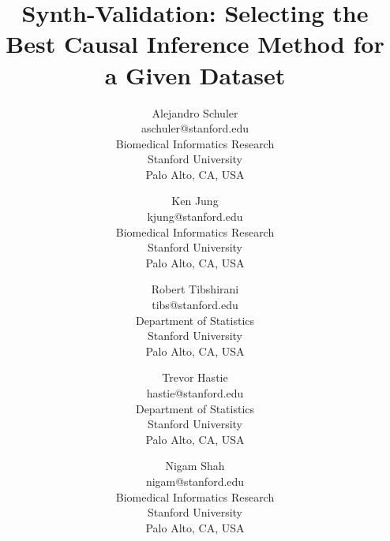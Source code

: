 \documentclass{article}
\begin{document}
\title{Synth-Validation: Selecting the Best Causal Inference Method for a Given Dataset}

\author{Alejandro Schuler \\
	aschuler@stanford.edu \\
       Biomedical Informatics Research\\
       Stanford University\\
       Palo Alto, CA, USA 
       \and
     Ken Jung\\
	 kjung@stanford.edu \\
       Biomedical Informatics Research\\
       Stanford University\\
       Palo Alto, CA, USA 
       \and
     Robert Tibshirani \\
     tibs@stanford.edu \\
       Department of Statistics\\
       Stanford University\\
       Palo Alto, CA, USA 
          \and
     Trevor Hastie \\
     hastie@stanford.edu \\
       Department of Statistics\\
       Stanford University\\
       Palo Alto, CA, USA 
          \and
     Nigam Shah \\
     nigam@stanford.edu \\
       Biomedical Informatics Research\\
       Stanford University\\
       Palo Alto, CA, USA }

\maketitle


 
 

 

 
 
 



\end{document}
